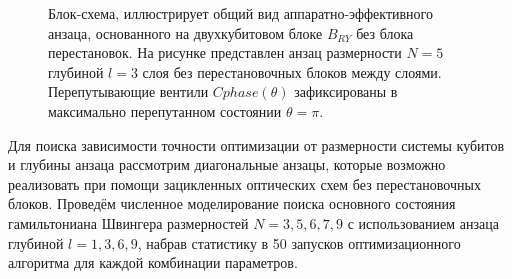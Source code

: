 \documentclass[14pt]{extarticle}
\begin{document}
\begin{figure}[H]
\caption{Блок-схема, иллюстрирует общий вид аппаратно-эффективного анзаца, основанного на двухкубитовом блоке $B_{RY}$ без блока перестановок. На рисунке представлен анзац размерности $N=5$ глубиной $l=3$ слоя без перестановочных блоков между слоями. Перепутывающие вентили $Cphase(\theta)$ зафиксированы в максимально перепутанном состоянии $\theta = \pi$.} \label{fig:Cphase_HEA_ansatz}
\end{figure}

\qquad Для поиска зависимости точности оптимизации от размерности системы кубитов и глубины анзаца рассмотрим диагональные анзацы, которые возможно реализовать при помощи зацикленных оптических схем без перестановочных блоков. Проведём численное моделирование поиска основного состояния гамильтониана Швингера размерностей $N = 3, 5, 6, 7, 9$ с использованием анзаца глубиной $l = 1, 3, 6, 9$, набрав статистику в 50 запусков оптимизационного алгоритма для каждой комбинации параметров. 
\end{document}
